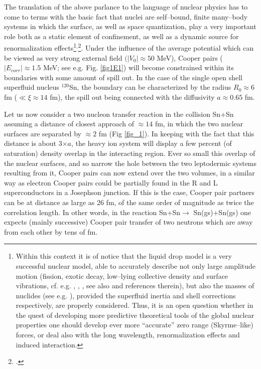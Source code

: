 The translation of the above parlance to the language of nuclear physics has to come to terms with the basic fact that nuclei are self--bound, finite many--body systems in which the surface, as well as space quantization, play a very important role both as a static element of confinement, as well as a dynamic source for renormalization effects\footnote{Within this context it is of notice that the liquid drop model is a very successful nuclear model, able to accurately describe not only large amplitude motion (fission, exotic decay, low--lying collective density and surface vibrations, cf. e.g. \cite{Bohr:39}, \cite{Barranco:90}, \cite{Bertsch:88b}, see also \cite{Brink:05} and references therein), but also the masses of nuclides (see e.g. \cite{Moller:95}), provided the superfluid inertia and shell corrections respectively, are properly considered. Thus, it is an open question whether in the quest of developing more predictive theoretical tools of the global nuclear properties one should develop ever more ``accurate'' zero range (Skyrme--like) forces, or deal also with the long wavelength, renormalization effects and induced interaction.}$^,$\footnote{\cite{Broglia:02d}.}.
Under the influence of the average potential which can be viewed as very strong external field $(|V_0|\approx 50$ MeV), Cooper pairs ($|E_{corr}|\approx 1.5$ MeV; see e.g. Fig. \ref{fig1E1}) will become constrained within its boundaries with some amount of spill out. In the case of the single open shell superfluid nucleus $^{120}$Sn, the boundary can be characterized by the radius $R_0\approx 6$ fm ($\ll \xi\approx 14$ fm), the spill out being connected with the diffusivity $a\approx 0.65$ fm. 


Let us now consider a two nucleon transfer reaction in the collision Sn+Sn assuming a distance of closest approach of $\approx 14$ fm, in which the two nuclear surfaces are separated by $\approx 2$ fm (Fig \ref{fig_1}). In keeping with the fact that this distance is about 3$\times a$, the heavy ion system will display a few percent (of saturation) density overlap in the interacting region. Ever so small this overlap of the nuclear surfaces, and so narrow the hole between the two leptodermic systems resulting from  it,  Cooper pairs can now extend over the two volumes, in a similar way as electron Cooper pairs could be partially found in the R and L superconductors in a Josephson junction. If this is the case, Cooper pair partners can be at distance as large as 26 fm, of the same order of magnitude as twice the correlation length. In other words, in the reaction Sn+Sn$\rightarrow$ Sn(gs)+Sn(gs) one expects (mainly successive) Cooper pair transfer of two neutrons which are away from each other by tens of fm.


